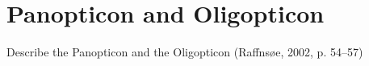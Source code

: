 \section{Panopticon and Oligopticon}
Describe the Panopticon and the Oligopticon (Raffnsøe, 2002, p. 54–57)
\newpage
